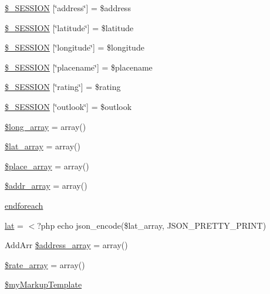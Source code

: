 \begin{DoxyCompactItemize}
\item 
\mbox{\hyperlink{location2_8php_a8a5e05131617a16eedd7427eaf437329}{\$\+\_\+\+S\+E\+S\+S\+I\+ON}} \mbox{[}\char`\"{}address\char`\"{}\mbox{]} = \$address
\item 
\mbox{\hyperlink{location2_8php_a399d6844a8329f151f8fc16af8ce3f57}{\$\+\_\+\+S\+E\+S\+S\+I\+ON}} \mbox{[}\char`\"{}latitude\char`\"{}\mbox{]} = \$latitude
\item 
\mbox{\hyperlink{location2_8php_a92cb64f3b08cacc2f2e3eb4231d966b4}{\$\+\_\+\+S\+E\+S\+S\+I\+ON}} \mbox{[}\char`\"{}longitude\char`\"{}\mbox{]} = \$longitude
\item 
\mbox{\hyperlink{location2_8php_acddeaa636a9daeb46d6c3b90710b06e1}{\$\+\_\+\+S\+E\+S\+S\+I\+ON}} \mbox{[}\char`\"{}placename\char`\"{}\mbox{]} = \$placename
\item 
\mbox{\hyperlink{location2_8php_af0c8fc6207df0eb2b4e2b0badf84f944}{\$\+\_\+\+S\+E\+S\+S\+I\+ON}} \mbox{[}\char`\"{}rating\char`\"{}\mbox{]} = \$rating
\item 
\mbox{\hyperlink{location2_8php_a6155e8ce48c8718260df3f8062aacef4}{\$\+\_\+\+S\+E\+S\+S\+I\+ON}} \mbox{[}\char`\"{}outlook\char`\"{}\mbox{]} = \$outlook
\item 
\mbox{\hyperlink{location2_8php_a38f52f2d6c65f438e274d8664766df99}{\$long\+\_\+array}} = array()
\item 
\mbox{\hyperlink{location2_8php_a5ad3d8dee8a4e075b6e08f71a9126b7b}{\$lat\+\_\+array}} = array()
\item 
\mbox{\hyperlink{location2_8php_a82de05dbcc693b8360b6bf30353862ce}{\$place\+\_\+array}} = array()
\item 
\mbox{\hyperlink{location2_8php_ad3201bd3f499ce3b8c06ce5037c61678}{\$addr\+\_\+array}} = array()
\item 
\mbox{\hyperlink{location2_8php_a672d9707ef91db026c210f98cc601123}{endforeach}}
\item 
\mbox{\hyperlink{location2_8php_abc5aa76a6d1e1812e4a79fa9c461dc75}{lat}} = $<$?php echo json\+\_\+encode(\$lat\+\_\+array, J\+S\+O\+N\+\_\+\+P\+R\+E\+T\+T\+Y\+\_\+\+P\+R\+I\+NT)
\item 
Add\+Arr \mbox{\hyperlink{location2_8php_a46d39dd41e655011973f72d6e05166f8}{\$address\+\_\+array}} = array()
\item 
\mbox{\hyperlink{location2_8php_aa3e1691490aa8305c46d7bc7e0d7c9a4}{\$rate\+\_\+array}} = array()
\item 
\mbox{\hyperlink{location2_8php_ad58b7d50a3bd82ab3735f8b74fbfccd2}{\$my\+Markup\+Template}}
\end{DoxyCompactItemize}


